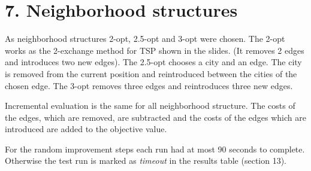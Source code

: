 \section*{7. Neighborhood structures}
As neighborhood structures 2-opt, 2.5-opt and 3-opt were chosen. The 2-opt works as the 2-exchange method for TSP shown in the slides. (It removes 2 edges and introduces two new edges). The 2.5-opt chooses a city and an edge. The city is removed from the current position and reintroduced between the cities of the chosen edge. The 3-opt removes three edges and reintroduces three new edges.

Incremental evaluation is the same for all neighborhood structure. The costs of the edges, which are removed, are subtracted and the costs of the edges which are introduced are added to the objective value.

For the random improvement steps each run had at most 90 seconds to complete. Otherwise the test run is marked as \textit{timeout} in the results table (section 13).

